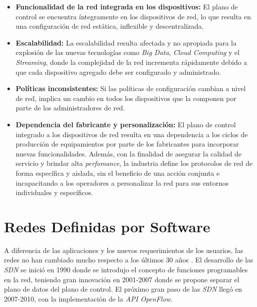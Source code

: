\begin{itemize}
	\item \textbf{Funcionalidad de la red integrada en los dispositivos:} El plano de control se encuentra íntegramente en los dispositivos de red, lo que resulta en una configuración de red estática, inflexible y descentralizada. 
	\item \textbf{Escalabilidad:} La escalabilidad resulta afectada y no apropiada para la explosión de las nuevas tecnologías como \textit{Big Data}, \textit{Cloud Computing} y el \textit{Streaming}, donde la complejidad de la red incrementa rápidamente debido a que cada dispositivo agregado debe ser configurado y administrado.
	\item \textbf{Políticas inconsistentes:} Si las políticas de configuración cambian a nivel de red, implica un cambio en todos los dispositivos que la componen por parte de los administradores de red.
	\item \textbf{Dependencia del fabricante y personalización:} El plano de control integrado a los dispositivos de red resulta en una dependencia a los ciclos de producción de equipamientos por parte de los fabricantes para incorporar nuevas funcionalidades. Además, con la finalidad de asegurar la calidad de servicio y brindar alta \textit{perfomance}, la industria define los protocolos de red de forma específica y aislada, sin el beneficio de una acción conjunta e incapacitando a los operadores a personalizar la red para sus entornos individuales y específicos. 
\end{itemize}

\section{Redes Definidas por Software} \label{sec:rsdn}

A diferencia de las aplicaciones y los nuevos requerimientos de los usuarios, las redes no han cambiado mucho respecto a los últimos 30 años \parencite{sdnroad}. El desarrollo de las \textit{SDN} se inició en 1990 donde se introdujo el concepto de funciones programables en la red, teniendo gran innovación en 2001-2007 donde se propone separar el plano de datos del plano de control. El próximo gran paso de las \textit{SDN} llegó en 2007-2010, con la implementación de la \textit{API OpenFlow}.
\\

